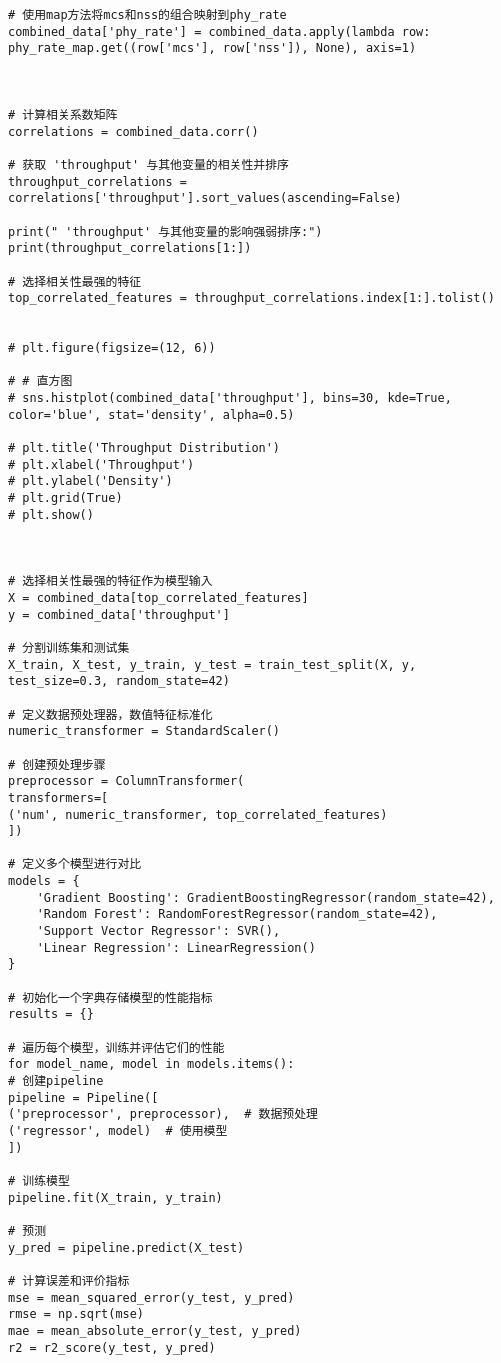 \documentclass[bwprint]{gmcmthesis}
\begin{document}
\begin{lstlisting}
# 使用map方法将mcs和nss的组合映射到phy_rate
combined_data['phy_rate'] = combined_data.apply(lambda row: phy_rate_map.get((row['mcs'], row['nss']), None), axis=1)



# 计算相关系数矩阵
correlations = combined_data.corr()

# 获取 'throughput' 与其他变量的相关性并排序
throughput_correlations = correlations['throughput'].sort_values(ascending=False)

print(" 'throughput' 与其他变量的影响强弱排序:")
print(throughput_correlations[1:])

# 选择相关性最强的特征
top_correlated_features = throughput_correlations.index[1:].tolist()


# plt.figure(figsize=(12, 6))

# # 直方图
# sns.histplot(combined_data['throughput'], bins=30, kde=True, color='blue', stat='density', alpha=0.5)

# plt.title('Throughput Distribution')
# plt.xlabel('Throughput')
# plt.ylabel('Density')
# plt.grid(True)
# plt.show()



# 选择相关性最强的特征作为模型输入
X = combined_data[top_correlated_features]
y = combined_data['throughput']

# 分割训练集和测试集
X_train, X_test, y_train, y_test = train_test_split(X, y, test_size=0.3, random_state=42)

# 定义数据预处理器，数值特征标准化
numeric_transformer = StandardScaler()

# 创建预处理步骤
preprocessor = ColumnTransformer(
transformers=[
('num', numeric_transformer, top_correlated_features)
])

# 定义多个模型进行对比
models = {
	'Gradient Boosting': GradientBoostingRegressor(random_state=42),
	'Random Forest': RandomForestRegressor(random_state=42),
	'Support Vector Regressor': SVR(),
	'Linear Regression': LinearRegression()
}

# 初始化一个字典存储模型的性能指标
results = {}

# 遍历每个模型，训练并评估它们的性能
for model_name, model in models.items():
# 创建pipeline
pipeline = Pipeline([
('preprocessor', preprocessor),  # 数据预处理
('regressor', model)  # 使用模型
])

# 训练模型
pipeline.fit(X_train, y_train)

# 预测
y_pred = pipeline.predict(X_test)

# 计算误差和评价指标
mse = mean_squared_error(y_test, y_pred)
rmse = np.sqrt(mse)
mae = mean_absolute_error(y_test, y_pred)
r2 = r2_score(y_test, y_pred)


\end{lstlisting}
\end{document}
